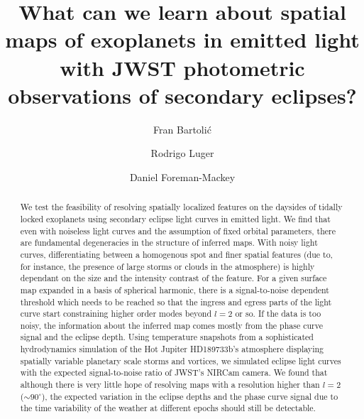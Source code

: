 \documentclass[modern]{aastex631}
\begin{document}
\title{
    \vspace{-3em}
    \textbf{
        What can we learn about spatial maps of exoplanets in emitted light with 
        JWST photometric observations of secondary eclipses?
    }
}
\author[0000-0001-8630-9794]{Fran Bartoli\'c}
\author[0000-0002-0296-3826]{Rodrigo Luger}
\author[0000-0002-9328-5652]{Daniel Foreman-Mackey}
%

\begin{abstract}
   We test the feasibility of resolving spatially localized features on the daysides of tidally 
   locked exoplanets using secondary eclipse light curves in emitted light. 
We find that even with noiseless light curves and the assumption of fixed orbital parameters, there are 
fundamental degeneracies in the structure of inferred maps. 
With noisy light curves, differentiating between a homogenous spot and finer spatial 
features (due to, for instance, the presence of large storms or clouds in the atmosphere) is 
highly dependant on the size and the intensity contrast of the feature.
For a given surface map expanded in a basis of spherical harmonic, there is a signal-to-noise dependent 
threshold which needs to be reached so that the ingress and egress parts of the light 
curve start constraining higher order modes beyond $l=2$ or so.
If the data is too noisy, the information about the inferred map comes mostly from the phase curve 
signal and the eclipse depth.
Using temperature snapshots from a sophisticated hydrodynamics simulation of the Hot Jupiter HD189733b's
atmosphere displaying spatially variable planetary scale storms and vortices, 
we simulated eclipse light curves with the expected signal-to-noise ratio of JWST's NIRCam camera. 
We found that although there is very little hope of resolving maps 
with a resolution higher than $l=2$ ($\sim 90^\circ$), the expected variation in 
the eclipse depths and the phase curve signal due to the time variability of the weather at different 
epochs should still be detectable.
\end{abstract}
\end{document}
